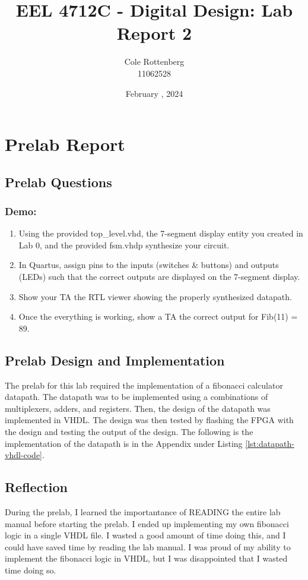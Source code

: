 \documentclass{article}
\title{EEL 4712C - Digital Design: Lab Report 2}
\author{Cole Rottenberg \\ 11062528}
\date{February \ordinalnum{18}, 2024}
\begin{document}
\maketitle


\section*{Prelab Report}

\subsection*{Prelab Questions}
\subsubsection*{Demo:}
\begin{enumerate}
  \item Using the provided top\_level.vhd, the 7-segment display entity you created in Lab 0, and the provided fsm.vhdp synthesize your circuit.
  \item In Quartus, assign pins to the inputs (switches \& buttons) and outputs (LEDs) such that the correct outputs are displayed on the 7-segment display.
  \item Show your TA the RTL viewer showing the properly synthesized datapath.
  \item Once the everything is working, show a TA the correct output for Fib(11) = 89.
\end{enumerate}

\subsection*{Prelab Design and Implementation}
The prelab for this lab required the implementation of a fibonacci calculator datapath. The datapath was to be implemented using a combinations of multiplexers, adders, and registers. Then, the design of the datapath was implemented in VHDL. The design was then tested by flashing the FPGA with the design and testing the output of the design. The following is the implementation of the datapath is in the Appendix under Listing \ref{lst:datapath-vhdl-code}.

\subsection*{Reflection}
During the prelab, I learned the importantance of READING the entire lab manual before starting the prelab. I ended up implementing my own fibonacci logic in a single VHDL file. I wasted a good amount of time doing this, and I could have saved time by reading the lab manual. I was proud of my ability to implement the fibonacci logic in VHDL, but I was disappointed that I wasted time doing so.
\end{document}
